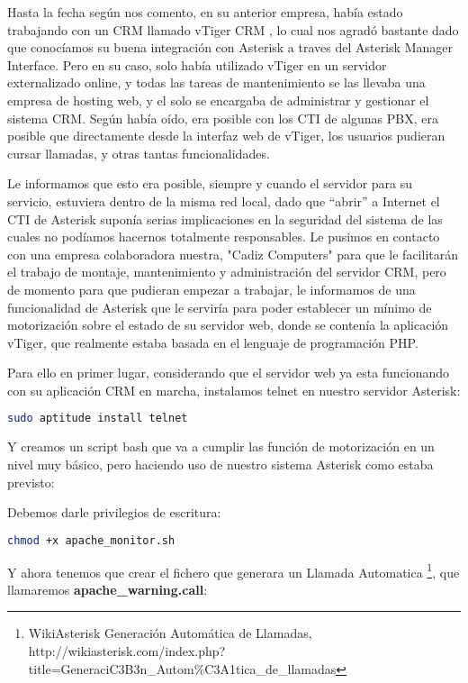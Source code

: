 Hasta la fecha según nos comento, en su anterior empresa, había estado trabajando con un CRM llamado vTiger CRM \cite{website:vtiger}, lo cual nos agradó bastante dado que conocíamos su buena integración con Asterisk a traves del Asterisk Manager Interface. Pero en su caso, solo había utilizado vTiger en un servidor externalizado online, y todas las tareas de mantenimiento se las llevaba una empresa de hosting web, y el solo se encargaba de administrar y gestionar el sistema CRM. Según había oído, era posible con los CTI \cite{website:ctiwikipedia} de algunas PBX, era posible que directamente desde la interfaz web de vTiger, los usuarios pudieran cursar llamadas, y otras tantas funcionalidades.

Le informamos que esto era posible, siempre y cuando el servidor para su servicio, estuviera dentro de la misma red local, dado que ``abrir'' a Internet el CTI de Asterisk suponía serias implicaciones en la seguridad del sistema de las cuales no podíamos hacernos totalmente responsables. Le pusimos en contacto con una empresa colaboradora nuestra, "Cadiz Computers" para que le facilitarán el trabajo de montaje, mantenimiento y administración del servidor CRM, pero de momento para que pudieran empezar a trabajar, le informamos de una funcionalidad de Asterisk que le serviría para poder establecer un mínimo de motorización sobre el estado de su servidor web, donde se contenía la aplicación vTiger, que realmente estaba basada en el lenguaje de programación PHP.

Para ello en primer lugar, considerando que el servidor web ya esta funcionando con su aplicación CRM en marcha, instalamos telnet en nuestro servidor Asterisk:

\begin{lstlisting}[language=sh]
sudo aptitude install telnet
\end{lstlisting}

Y creamos un script bash que va a cumplir las función de motorización en un nivel muy básico, pero haciendo uso de nuestro sistema Asterisk como estaba previsto:



Debemos darle privilegios de escritura:

\begin{lstlisting}[language=sh]
chmod +x apache_monitor.sh
\end{lstlisting}

Y ahora tenemos que crear el fichero que generara un Llamada Automatica \footnote{WikiAsterisk Generación Automática de Llamadas, \\ http://wikiasterisk.com/index.php?title=GeneraciC3B3n\_Autom\%C3A1tica\_de\_llamadas}, que llamaremos \textbf{apache\_warning.call}:

